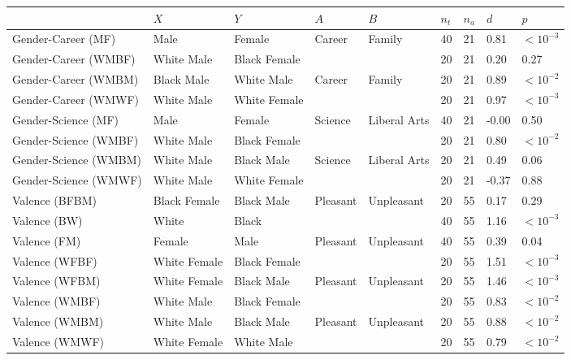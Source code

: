\begin{tabular}{lllllllll}
\toprule
{} &           $X$ &           $Y$ &       $A$ &           $B$ & $n_t$ & $n_a$ &                       $d$ &         $p$ \\
\midrule
Gender-Career (MF)    &          Male &        Female &    Career &        Family &    40 &    21 &   \cellcolor{d_large}0.81 &  $<10^{-3}$ \\
Gender-Career (WMBF)  &    White Male &  Black Female &           &               &    20 &    21 &                      0.20 &        0.27 \\
Gender-Career (WMBM)  &    Black Male &    White Male &    Career &        Family &    20 &    21 &   \cellcolor{d_large}0.89 &  $<10^{-2}$ \\
Gender-Career (WMWF)  &    White Male &  White Female &           &               &    20 &    21 &   \cellcolor{d_large}0.97 &  $<10^{-3}$ \\
Gender-Science (MF)   &          Male &        Female &   Science &  Liberal Arts &    40 &    21 &                     -0.00 &        0.50 \\
Gender-Science (WMBF) &    White Male &  Black Female &           &               &    20 &    21 &  \cellcolor{d_medium}0.80 &  $<10^{-2}$ \\
Gender-Science (WMBM) &    White Male &    Black Male &   Science &  Liberal Arts &    20 &    21 &   \cellcolor{d_small}0.49 &        0.06 \\
Gender-Science (WMWF) &    White Male &  White Female &           &               &    20 &    21 &                     -0.37 &        0.88 \\
Valence (BFBM)        &  Black Female &    Black Male &  Pleasant &    Unpleasant &    20 &    55 &                      0.17 &        0.29 \\
Valence (BW)          &         White &         Black &           &               &    40 &    55 &   \cellcolor{d_large}1.16 &  $<10^{-3}$ \\
Valence (FM)          &        Female &          Male &  Pleasant &    Unpleasant &    40 &    55 &   \cellcolor{d_small}0.39 &        0.04 \\
Valence (WFBF)        &  White Female &  Black Female &           &               &    20 &    55 &   \cellcolor{d_large}1.51 &  $<10^{-3}$ \\
Valence (WFBM)        &  White Female &    Black Male &  Pleasant &    Unpleasant &    20 &    55 &   \cellcolor{d_large}1.46 &  $<10^{-3}$ \\
Valence (WMBF)        &    White Male &  Black Female &           &               &    20 &    55 &   \cellcolor{d_large}0.83 &  $<10^{-2}$ \\
Valence (WMBM)        &    White Male &    Black Male &  Pleasant &    Unpleasant &    20 &    55 &   \cellcolor{d_large}0.88 &  $<10^{-2}$ \\
Valence (WMWF)        &  White Female &    White Male &           &               &    20 &    55 &  \cellcolor{d_medium}0.79 &  $<10^{-2}$ \\
\bottomrule
\end{tabular}
